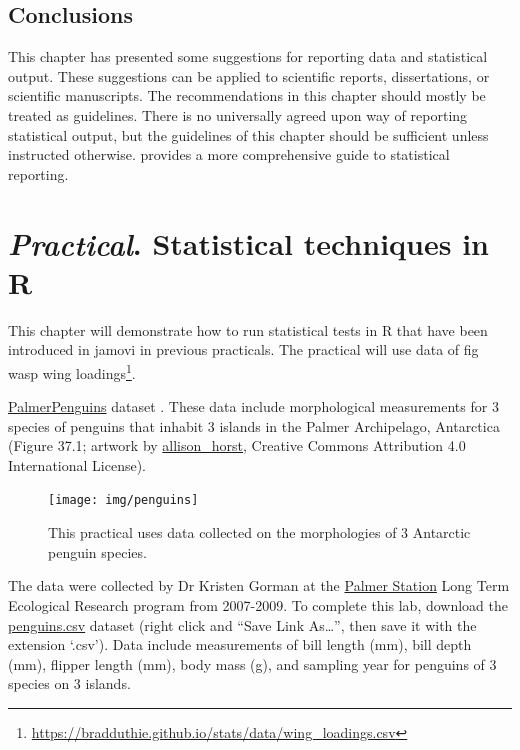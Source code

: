 \documentclass[
]{scrbook}
\begin{document}
\hypertarget{conclusions}{%
\section{Conclusions}\label{conclusions}}

This chapter has presented some suggestions for reporting data and statistical output.
These suggestions can be applied to scientific reports, dissertations, or scientific manuscripts.
The recommendations in this chapter should mostly be treated as guidelines.
There is no universally agreed upon way of reporting statistical output, but the guidelines of this chapter should be sufficient unless instructed otherwise.
\citet{Lang1997} provides a more comprehensive guide to statistical reporting.

\hypertarget{Chapter_39}{%
\chapter{\texorpdfstring{\emph{Practical}. Statistical techniques in R}{Practical. Statistical techniques in R}}\label{Chapter_39}}

This chapter will demonstrate how to run statistical tests in R that have been introduced in jamovi in previous practicals.
The practical will use data of fig wasp wing loadings\footnote{\url{https://bradduthie.github.io/stats/data/wing_loadings.csv}}.

\href{https://allisonhorst.github.io/palmerpenguins/articles/intro.html\#package-citation-1}{PalmerPenguins} dataset \citep{GormanEtAl2014, HorstEtAl2020}.
These data include morphological measurements for 3 species of penguins that inhabit 3 islands in the Palmer Archipelago, Antarctica (Figure 37.1; artwork by \href{https://allisonhorst.com/}{allison\_horst}, Creative Commons Attribution 4.0 International License).

\begin{figure}
\texttt{[image: img/penguins]} \caption{This practical uses data collected on the morphologies of 3 Antarctic penguin species.}\label{fig:unnamed-chunk-218}
\end{figure}

The data were collected by Dr Kristen Gorman at the \href{https://pal.lternet.edu/}{Palmer Station} Long Term Ecological Research program from 2007-2009.
To complete this lab, download the \href{https://raw.githubusercontent.com/bradduthie/SCIU4T4/main/data/penguins.csv}{penguins.csv} dataset (right click and ``Save Link As\ldots{}'', then save it with the extension `.csv').
Data include measurements of bill length (mm), bill depth (mm), flipper length (mm), body mass (g), and sampling year for penguins of 3 species on 3 islands.
\end{document}
